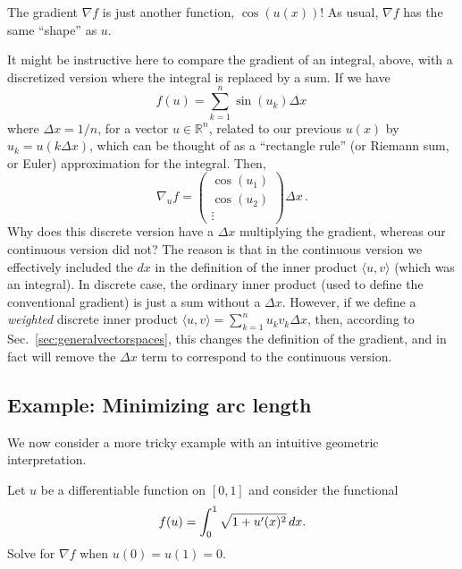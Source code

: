 The gradient $\nabla f$ is just another function, $\cos(u(x))$!  As usual, $\nabla f$ has the same ``shape'' as $u$.

\begin{remark}
It might be instructive here to compare the gradient of an integral, above, with a discretized version where the integral is replaced by a sum.   If we have
$$
f(u) = \sum_{k=1}^n \sin(u_k) \Delta x \,
$$
where $\Delta x = 1/n$,
for a vector $u \in \mathbb{R}^n$, related to our previous $u(x)$ by $u_k = u(k\Delta x)$, which can be thought of as a ``rectangle rule'' (or Riemann sum, or Euler) approximation for the integral.  Then,
$$
\nabla_u f = \begin{pmatrix} \cos(u_1) \\ \cos(u_2) \\ \vdots \end{pmatrix} \Delta x  \, .
$$
Why does this discrete version have a $\Delta x$ multiplying the gradient, whereas our continuous version did not?  The reason is that in the continuous version we effectively included the $dx$ in the definition of the inner product $\langle u, v \rangle$ (which was an integral).  In discrete case, the ordinary inner product (used to define the conventional gradient) is just a sum without a $\Delta x$.  However, if we define a \emph{weighted} discrete inner product
$\langle u, v \rangle = \sum_{k=1}^n u_k v_k \Delta x$, then, according to Sec.~\ref{sec:generalvectorspaces}, this changes the definition of the gradient, and in fact will remove the $\Delta x$ term to correspond to the continuous version.
\end{remark}


\subsection{Example: Minimizing arc length}

We now consider a more tricky example with an intuitive geometric interpretation.

\begin{example}
    Let $u$ be a differentiable function on $[0,1]$ and consider the functional 
    \[
    f(u) = \int_0^1 \sqrt{1+ u'(x)^2}\,d x.
    \]
    Solve for $\nabla f$ when $u(0) = u(1) = 0.$
\end{example}

